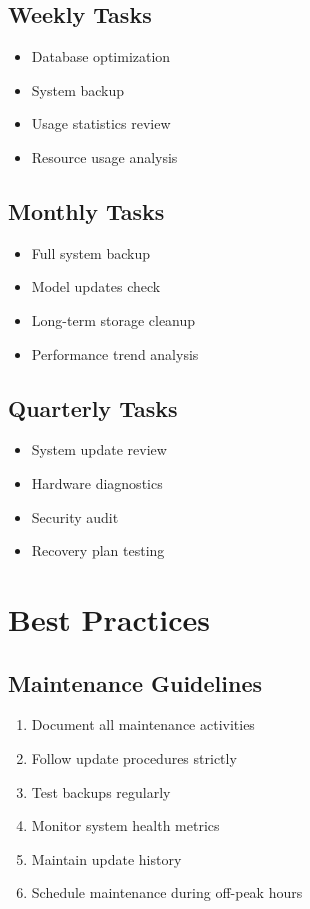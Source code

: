 \subsection{Weekly Tasks}
\begin{itemize}
    \item Database optimization
    \item System backup
    \item Usage statistics review
    \item Resource usage analysis
\end{itemize}

\subsection{Monthly Tasks}
\begin{itemize}
    \item Full system backup
    \item Model updates check
    \item Long-term storage cleanup
    \item Performance trend analysis
\end{itemize}

\subsection{Quarterly Tasks}
\begin{itemize}
    \item System update review
    \item Hardware diagnostics
    \item Security audit
    \item Recovery plan testing
\end{itemize}

\section{Best Practices}

\subsection{Maintenance Guidelines}
\begin{enumerate}
    \item Document all maintenance activities
    \item Follow update procedures strictly
    \item Test backups regularly
    \item Monitor system health metrics
    \item Maintain update history
    \item Schedule maintenance during off-peak hours
\end{enumerate}

